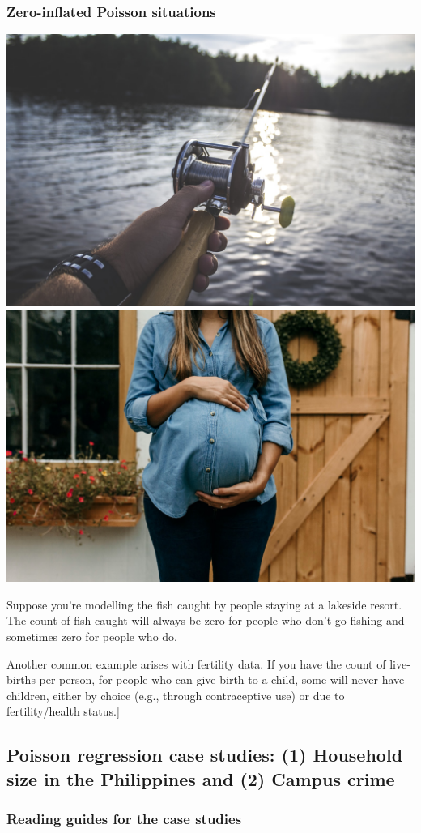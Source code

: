 \documentclass[
  openany]{book}
\begin{document}
\hypertarget{zero-inflated-poisson-situations}{%
\subsubsection{Zero-inflated Poisson situations}\label{zero-inflated-poisson-situations}}

\begin{center}\includegraphics[width=0.49\linewidth,height=0.2\textheight]{images/m4/fishing} \includegraphics[width=0.49\linewidth,height=0.2\textheight]{images/m4/preggers} \end{center}

Suppose you're modelling the fish caught by people staying at a lakeside
resort. The count of fish caught will always be zero for people who
don't go fishing and sometimes zero for people who do.

Another common example arises with fertility data. If you have the count
of live-births per person, for people who can give birth to a child,
some will never have children, either by choice (e.g., through
contraceptive use) or due to fertility/health status.{]}

\hypertarget{poisson-regression-case-studies-1-household-size-in-the-philippines-and-2-campus-crime}{%
\subsection{Poisson regression case studies: (1) Household size in the Philippines and (2) Campus crime}\label{poisson-regression-case-studies-1-household-size-in-the-philippines-and-2-campus-crime}}

\hypertarget{reading-guides-for-the-case-studies}{%
\subsubsection{Reading guides for the case studies}\label{reading-guides-for-the-case-studies}}
\end{document}
